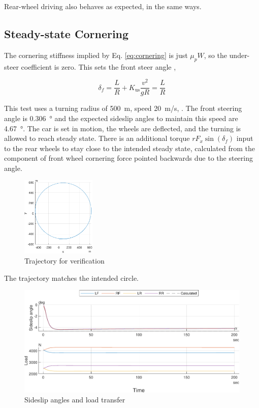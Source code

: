 \documentclass[9pt]{extarticle}
\begin{document}
\begin{multicols*}{2}
Rear-wheel driving also behaves as expected, in the same ways.

\subsection{Steady-state Cornering}

The cornering stiffness implied by Eq. \ref{eq:cornering} is just \(\mu_p W\),
so the under-steer coefficient is zero. This sets the front steer angle
\cite{wongturns},

\begin{equation}
	\delta_f = \frac{L}{R} + K_\text{us} \frac{v^2}{gR} = \frac{L}{R}
\end{equation}


This test uses a turning radius of \SI{500}{m}, speed \SI{20}{m/s}, . The front
steering angle is \SI{0.306}{\degree} and the expected sideslip angles to
maintain this speed are \SI{4.67}{\degree}. The car is set in motion, the wheels
are deflected, and the turning is allowed to reach steady state. There is an
additional torque \(rF_x\sin(\delta_f)\) input to the rear wheels to stay close
to the intended steady state, calculated from the component of front wheel
cornering force pointed backwards due to the steering angle.

\begin{figure}[H]
	\centering
	\includegraphics[height=1.5in]{fig/trajectory.pdf}
	\caption{Trajectory for verification}
\end{figure}

The trajectory matches the intended circle.

\begin{figure}[H]
	\centering
	\includegraphics[width=\linewidth]{fig/circle_forces.pdf}
	\caption{Sideslip angles and load transfer}
\end{figure}


\end{multicols*}
\end{document}
